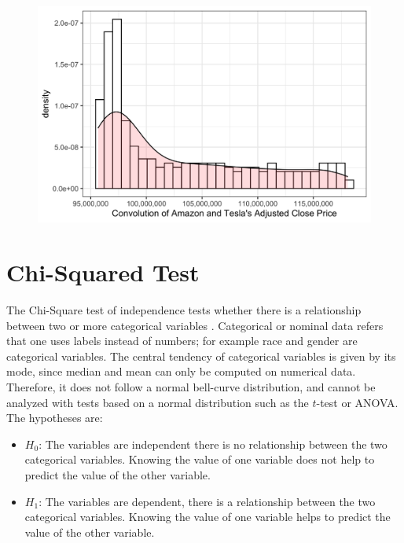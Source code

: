 \documentclass[10pt,leter,openany]{article}
\begin{document}
		\begin{figure}
			\begin{center}
				\includegraphics[scale=0.21]{extras/hist_stocks}
				\label{fig:conv1}
			\end{center}
		\end{figure}


\section{Chi-Squared Test}

The Chi-Square test of independence tests whether there is a relationship between two or more categorical variables  \citep{soetewey2020}.  Categorical or nominal data refers that one uses labels instead of numbers; for example race and gender are categorical variables. The central tendency of categorical variables is given by its mode, since median and mean can only be computed on numerical data. Therefore, it does not follow a normal bell-curve distribution, and cannot be analyzed with tests based on a normal distribution such as the $t$-test or ANOVA. The hypotheses are:
\begin{itemize}
	\item $H_{0}$: The variables are independent there is no relationship between the two categorical variables. Knowing the value of one variable does not help to predict the value of the other variable.
	\item $H_{1}$: The variables are dependent, there is a relationship between the two categorical variables. Knowing the value of one variable helps to predict the value of the other variable.
\end{itemize}
\end{document}
